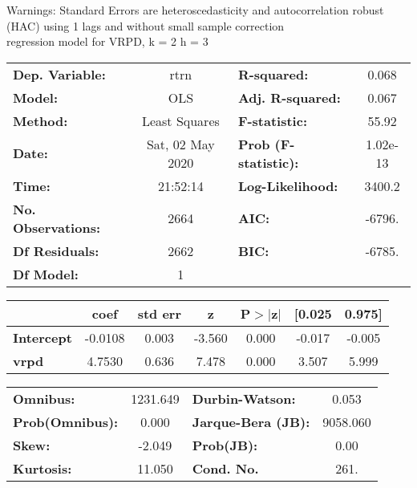 Warnings: \newline
 [1] Standard Errors are heteroscedasticity and autocorrelation robust (HAC) using 1 lags and without small sample correction\\ 

regression model for VRPD, k = 2 h = 3\begin{center}
\begin{tabular}{lclc}
\toprule
\textbf{Dep. Variable:}    &       rtrn       & \textbf{  R-squared:         } &     0.068   \\
\textbf{Model:}            &       OLS        & \textbf{  Adj. R-squared:    } &     0.067   \\
\textbf{Method:}           &  Least Squares   & \textbf{  F-statistic:       } &     55.92   \\
\textbf{Date:}             & Sat, 02 May 2020 & \textbf{  Prob (F-statistic):} &  1.02e-13   \\
\textbf{Time:}             &     21:52:14     & \textbf{  Log-Likelihood:    } &    3400.2   \\
\textbf{No. Observations:} &        2664      & \textbf{  AIC:               } &    -6796.   \\
\textbf{Df Residuals:}     &        2662      & \textbf{  BIC:               } &    -6785.   \\
\textbf{Df Model:}         &           1      & \textbf{                     } &             \\
\bottomrule
\end{tabular}
\begin{tabular}{lcccccc}
                   & \textbf{coef} & \textbf{std err} & \textbf{z} & \textbf{P$> |$z$|$} & \textbf{[0.025} & \textbf{0.975]}  \\
\midrule
\textbf{Intercept} &      -0.0108  &        0.003     &    -3.560  &         0.000        &       -0.017    &       -0.005     \\
\textbf{vrpd}      &       4.7530  &        0.636     &     7.478  &         0.000        &        3.507    &        5.999     \\
\bottomrule
\end{tabular}
\begin{tabular}{lclc}
\textbf{Omnibus:}       & 1231.649 & \textbf{  Durbin-Watson:     } &    0.053  \\
\textbf{Prob(Omnibus):} &   0.000  & \textbf{  Jarque-Bera (JB):  } & 9058.060  \\
\textbf{Skew:}          &  -2.049  & \textbf{  Prob(JB):          } &     0.00  \\
\textbf{Kurtosis:}      &  11.050  & \textbf{  Cond. No.          } &     261.  \\
\bottomrule
\end{tabular}
\end{center}

